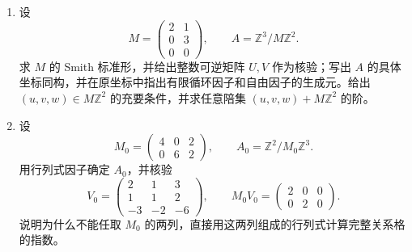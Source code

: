\begin{exercise}\label{b1:ex:09-rectangular-smith}
	\begin{enumerate}
		\item 设
			\[
				M=\begin{pmatrix}2&1\\0&3\\0&0\end{pmatrix},\qquad
				A=\mathbb Z^3/M\mathbb Z^2.
			\]
			求 \(M\) 的 Smith 标准形，并给出整数可逆矩阵 \(U,V\) 作为核验；写出 \(A\) 的具体坐标同构，并在原坐标中指出有限循环因子和自由因子的生成元。给出 \((u,v,w)\in M\mathbb Z^2\) 的充要条件，并求任意陪集 \((u,v,w)+M\mathbb Z^2\) 的阶。
		\item 设
			\[
				M_0=
				\begin{pmatrix}
					4&0&2\\
					0&6&2
				\end{pmatrix},
				\qquad A_0=\mathbb Z^2/M_0\mathbb Z^3.
			\]
			用行列式因子确定 \(A_0\)，并核验
			\[
				V_0=
				\begin{pmatrix}
					2&1&3\\
					1&1&2\\
					-3&-2&-6
				\end{pmatrix},
				\qquad M_0V_0=
				\begin{pmatrix}
					2&0&0\\
					0&2&0
				\end{pmatrix}.
			\]
			说明为什么不能任取 \(M_0\) 的两列，直接用这两列组成的行列式计算完整关系格的指数。
	\end{enumerate}
\end{exercise}
